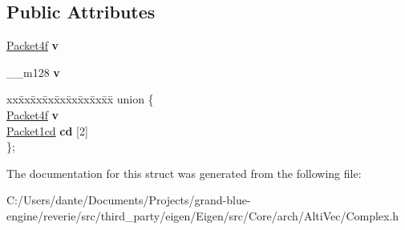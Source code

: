 \subsection*{Public Attributes}
\begin{DoxyCompactItemize}
\item 
\mbox{\label{struct_eigen_1_1internal_1_1_packet2cf_a0d764429cf0924d0fa93fbef9fe4e187}} 
\mbox{\hyperlink{struct_eigen_1_1internal_1_1_packet4f}{Packet4f}} {\bfseries v}
\item 
\mbox{\label{struct_eigen_1_1internal_1_1_packet2cf_acd2643b2d029def252d3fd98eec2c054}} 
\+\_\+\+\_\+m128 {\bfseries v}
\item 
\mbox{\label{struct_eigen_1_1internal_1_1_packet2cf_a23827fa75a939f027d99c910de0ec40f}} 
\begin{tabbing}
xx\=xx\=xx\=xx\=xx\=xx\=xx\=xx\=xx\=\kill
union \{\\
\>\mbox{\hyperlink{struct_eigen_1_1internal_1_1_packet4f}{Packet4f}} {\bfseries v}\\
\>\mbox{\hyperlink{struct_eigen_1_1internal_1_1_packet1cd}{Packet1cd}} {\bfseries cd} \mbox{[}2\mbox{]}\\
\}; \\

\end{tabbing}\end{DoxyCompactItemize}


The documentation for this struct was generated from the following file\+:\begin{DoxyCompactItemize}
\item 
C\+:/\+Users/dante/\+Documents/\+Projects/grand-\/blue-\/engine/reverie/src/third\+\_\+party/eigen/\+Eigen/src/\+Core/arch/\+Alti\+Vec/Complex.\+h\end{DoxyCompactItemize}
